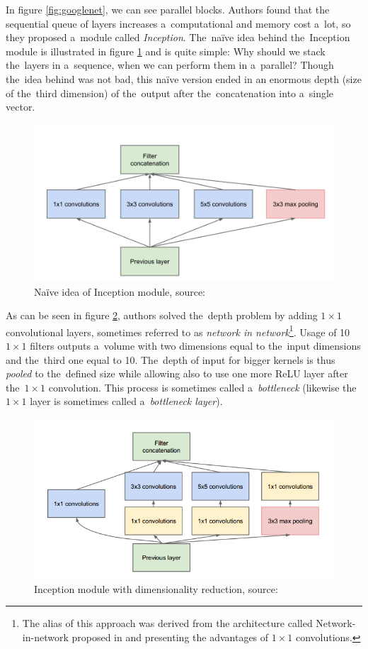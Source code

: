 In figure \ref{fig:googlenet}, we can see parallel blocks. Authors found that 
the sequential queue of layers increases a~computational and memory cost a~lot,
so they proposed a~module called \textit{Inception}. The~naïve idea behind
the~Inception module is illustrated in figure \ref{fig:inception-naive} and is
quite simple: Why should we stack the~layers in a~sequence, when we can perform
them in a~parallel? Though the~idea behind was not bad, this naïve version
ended in an enormous depth (size of the~third dimension) of the~output after
the~concatenation into a~single vector.

\begin{figure}[H]
   \centering
	\includegraphics[width=0.8\linewidth]{./pictures/inception-naive.png}
	\caption[Inception module, naïve idea]{Naïve idea of Inception module, source: 
	\cite{googlenet}}
      \label{fig:inception-naive}
\end{figure}

As can be seen in figure \ref{fig:inception-full}, authors solved the~depth 
problem by adding $1 \times 1$ convolutional layers, sometimes referred to as 
\textit{network in network}\footnote{The alias of this approach was derived
from the architecture called Network-in-network proposed in \cite{nin} and
presenting the advantages of $1 \times 1$ convolutions.}. Usage of 10
$1 \times 1$ filters outputs a~volume with two dimensions equal to the~input
dimensions and the~third one equal to 10. The~depth of input for bigger kernels
is thus \textit{pooled} to the~defined size while allowing also to use one more
ReLU layer after the~$1 \times 1$ convolution. This process is sometimes called
a~\textit{bottleneck} (likewise the~$1 \times 1$ layer is sometimes called
a~\textit{bottleneck layer}).

\begin{figure}[H]
   \centering
	\includegraphics[width=0.8\linewidth]{./pictures/inception-full.png}
	\caption[Inception module, full]{Inception module with dimensionality 
	reduction, source: \cite{googlenet}}
      \label{fig:inception-full}
\end{figure}

